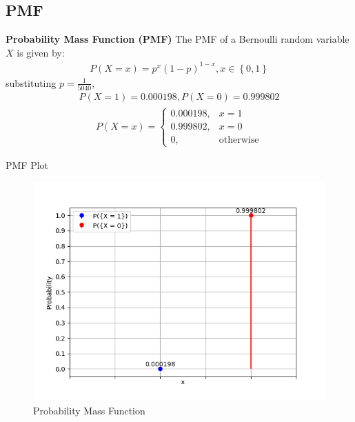 \documentclass{beamer}
\providecommand{\brak}[1]{\ensuremath{\left(#1\right)}}
\providecommand{\cbrak}[1]{\ensuremath{\left\{#1\right\}}}
\theoremstyle{remark}
\numberwithin{equation}{section}
\begin{document}
\subsection{PMF}
\begin{frame}{\textbf{Probability Mass Function (PMF)}}
        The PMF  of a Bernoulli random variable $X$ is given by:
    \begin{align}
	P\brak{X = x} = p^x\brak{1 - p}^{1 - x}, x \in \cbrak{0,1}
    \end{align}
    substituting $p = \frac{1}{5040}$,\\
    \begin{align}
     P\brak{X = 1} = 0.000198, P\brak{X = 0} = 0.999802
    \end{align}
    \begin{align}
    	P\brak{X = x} = \begin{cases}
    		0.000198, & x = 1 \\
    		0.999802, & x = 0 \\
    		0, & \text{otherwise}
    	\end{cases}
    \end{align}
\end{frame}

\begin{frame}{PMF Plot}
    \begin{figure}
        \centering
        \includegraphics[width=0.8\linewidth]{figs/pmf.png}
        \caption{Probability Mass Function}
        \label{fig:enter-label}
    \end{figure}
\end{frame}
\end{document}
